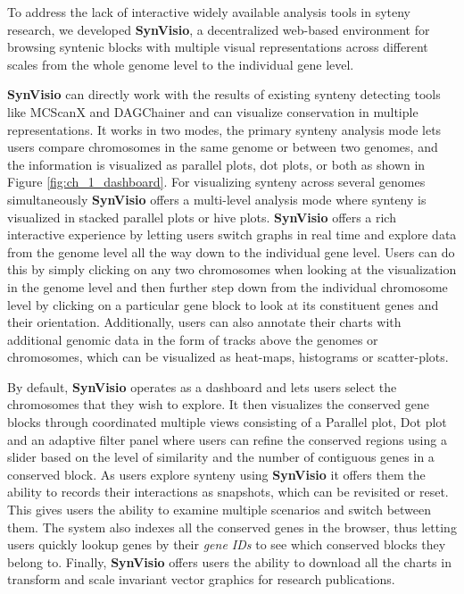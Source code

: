To address the lack of interactive widely available analysis tools in syteny research, we developed \textbf{SynVisio}, a decentralized web-based environment for browsing syntenic blocks with multiple visual representations across different scales from the whole genome level to the individual gene level.

\textbf{SynVisio} can directly work with the results of existing synteny detecting tools like MCScanX\cite{wang2012mcscanx} and DAGChainer\cite{haas2004dagchainer} and can visualize conservation in multiple representations. It works in two modes, the primary synteny analysis mode lets users compare chromosomes in the same genome or between two genomes, and the information is visualized as parallel plots, dot plots, or both as shown in Figure \ref{fig:ch_1_dashboard}. For visualizing synteny across several genomes simultaneously \textbf{SynVisio} offers a multi-level analysis mode where synteny is visualized in stacked parallel plots or hive plots. \textbf{SynVisio} offers a rich interactive experience by letting users switch graphs in real time and explore data from the genome level all the way down to the individual gene level. Users can do this by simply clicking on any two chromosomes when looking at the visualization in the genome level and then further step down from the individual chromosome level by clicking on a particular gene block to look at its constituent genes and their orientation. Additionally, users can also annotate their charts with additional genomic data in the form of tracks above the genomes or chromosomes, which can be visualized as heat-maps, histograms or scatter-plots.

By default, \textbf{SynVisio} operates as a dashboard and lets users select the chromosomes that they wish to explore. It then visualizes the conserved gene blocks through coordinated multiple views consisting of a Parallel plot, Dot plot and an adaptive filter panel where users can refine the conserved regions using a slider based on the level of similarity and the number of contiguous genes in a conserved block.
As users explore synteny using \textbf{SynVisio} it offers them the ability to records their interactions as snapshots, which can be revisited or reset. This gives users the ability to examine multiple scenarios and switch between them. The system also indexes all the conserved genes in the browser, thus letting users quickly lookup genes by their \textit{gene IDs} to see which conserved blocks they belong to. Finally, \textbf{SynVisio} offers users the ability to download all the charts in transform and scale invariant vector graphics for research publications.

